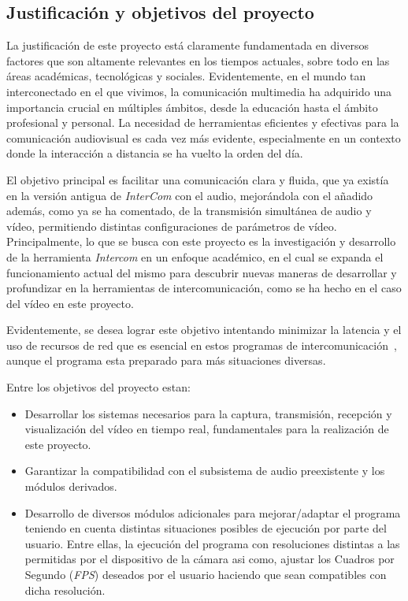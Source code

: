 \subsection{Justificación y objetivos del proyecto}
La justificación de este proyecto está claramente fundamentada en diversos factores que son altamente relevantes en los tiempos actuales, sobre todo en las áreas académicas, tecnológicas y sociales. Evidentemente, en el mundo tan interconectado en el que vivimos, la comunicación multimedia ha adquirido una importancia crucial en múltiples ámbitos, desde la educación hasta el ámbito profesional y personal. La necesidad de herramientas eficientes y efectivas para la comunicación audiovisual es cada vez más evidente, especialmente en un contexto donde la interacción a distancia se ha vuelto la orden del día.\cite{GSMA}
\vspace{\baselineskip}

El objetivo principal es facilitar una comunicación clara y fluida, que ya existía en la versión antigua de \textit{InterCom} con el audio, mejorándola con el añadido además, como ya se ha comentado, de la transmisión simultánea de audio y vídeo, permitiendo distintas configuraciones de parámetros de vídeo. Principalmente, lo que se busca con este proyecto es la investigación y desarrollo de la herramienta \textit{Intercom} en un enfoque académico, en el cual se expanda el funcionamiento actual del mismo para descubrir nuevas maneras de desarrollar y profundizar en la herramientas de intercomunicación, como se ha hecho en el caso del vídeo en este proyecto.

\vspace{\baselineskip}
Evidentemente, se desea lograr este objetivo intentando minimizar la latencia y el uso de recursos de red que es esencial en estos programas de intercomunicación~\cite{cisco}, aunque el programa esta preparado para más situaciones diversas.

\vspace{\baselineskip}

Entre los objetivos del proyecto estan:

\begin{itemize}
	\item Desarrollar los sistemas necesarios para la captura, transmisión, recepción y visualización del vídeo en tiempo real, fundamentales para la realización de este proyecto.
	\item Garantizar la compatibilidad con el subsistema de audio preexistente y los módulos derivados.
	\item Desarrollo de diversos módulos adicionales para mejorar/adaptar el programa teniendo en cuenta distintas situaciones posibles de ejecución por parte del usuario. Entre ellas, la ejecución del programa con resoluciones distintas a las permitidas por el dispositivo de la cámara asi como, ajustar los Cuadros por Segundo (\textit{FPS}) deseados por el usuario haciendo que sean compatibles con dicha resolución.
\end{itemize}
\vspace{\baselineskip}


